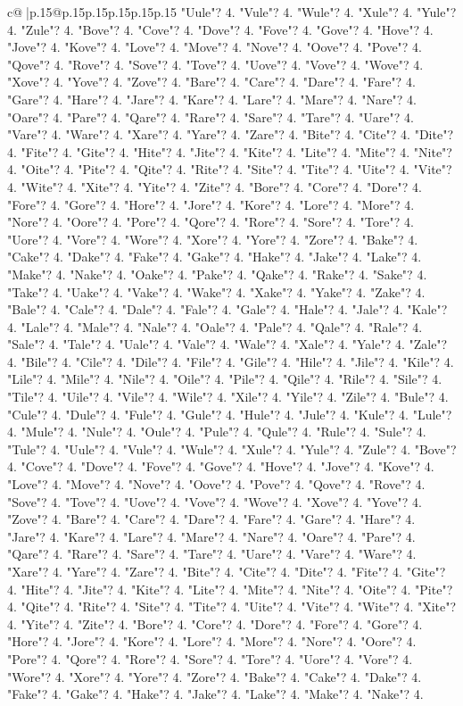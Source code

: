 \documentclass{article}
\begin{document}
{\begin{supertabular}{c@{$\;$}|p{.15\linewidth}@{}p{.15\linewidth}p{.15\linewidth}p{.15\linewidth}p{.15\linewidth}p{.15\linewidth}}
{{{"Uule"? 4. "Vule"? 4. "Wule"? 4. "Xule"? 4. "Yule"? 4. "Zule"? 4. "Bove"? 4. "Cove"? 4. "Dove"? 4. "Fove"? 4. "Gove"? 4. "Hove"? 4. "Jove"? 4. "Kove"? 4. "Love"? 4. "Move"? 4. "Nove"? 4. "Oove"? 4. "Pove"? 4. "Qove"? 4. "Rove"? 4. "Sove"? 4. "Tove"? 4. "Uove"? 4. "Vove"? 4. "Wove"? 4. "Xove"? 4. "Yove"? 4. "Zove"? 4. "Bare"? 4. "Care"? 4. "Dare"? 4. "Fare"? 4. "Gare"? 4. "Hare"? 4. "Jare"? 4. "Kare"? 4. "Lare"? 4. "Mare"? 4. "Nare"? 4. "Oare"? 4. "Pare"? 4. "Qare"? 4. "Rare"? 4. "Sare"? 4. "Tare"? 4. "Uare"? 4. "Vare"? 4. "Ware"? 4. "Xare"? 4. "Yare"? 4. "Zare"? 4. "Bite"? 4. "Cite"? 4. "Dite"? 4. "Fite"? 4. "Gite"? 4. "Hite"? 4. "Jite"? 4. "Kite"? 4. "Lite"? 4. "Mite"? 4. "Nite"? 4. "Oite"? 4. "Pite"? 4. "Qite"? 4. "Rite"? 4. "Site"? 4. "Tite"? 4. "Uite"? 4. "Vite"? 4. "Wite"? 4. "Xite"? 4. "Yite"? 4. "Zite"? 4. "Bore"? 4. "Core"? 4. "Dore"? 4. "Fore"? 4. "Gore"? 4. "Hore"? 4. "Jore"? 4. "Kore"? 4. "Lore"? 4. "More"? 4. "Nore"? 4. "Oore"? 4. "Pore"? 4. "Qore"? 4. "Rore"? 4. "Sore"? 4. "Tore"? 4. "Uore"? 4. "Vore"? 4. "Wore"? 4. "Xore"? 4. "Yore"? 4. "Zore"? 4. "Bake"? 4. "Cake"? 4. "Dake"? 4. "Fake"? 4. "Gake"? 4. "Hake"? 4. "Jake"? 4. "Lake"? 4. "Make"? 4. "Nake"? 4. "Oake"? 4. "Pake"? 4. "Qake"? 4. "Rake"? 4. "Sake"? 4. "Take"? 4. "Uake"? 4. "Vake"? 4. "Wake"? 4. "Xake"? 4. "Yake"? 4. "Zake"? 4. "Bale"? 4. "Cale"? 4. "Dale"? 4. "Fale"? 4. "Gale"? 4. "Hale"? 4. "Jale"? 4. "Kale"? 4. "Lale"? 4. "Male"? 4. "Nale"? 4. "Oale"? 4. "Pale"? 4. "Qale"? 4. "Rale"? 4. "Sale"? 4. "Tale"? 4. "Uale"? 4. "Vale"? 4. "Wale"? 4. "Xale"? 4. "Yale"? 4. "Zale"? 4. "Bile"? 4. "Cile"? 4. "Dile"? 4. "File"? 4. "Gile"? 4. "Hile"? 4. "Jile"? 4. "Kile"? 4. "Lile"? 4. "Mile"? 4. "Nile"? 4. "Oile"? 4. "Pile"? 4. "Qile"? 4. "Rile"? 4. "Sile"? 4. "Tile"? 4. "Uile"? 4. "Vile"? 4. "Wile"? 4. "Xile"? 4. "Yile"? 4. "Zile"? 4. "Bule"? 4. "Cule"? 4. "Dule"? 4. "Fule"? 4. "Gule"? 4. "Hule"? 4. "Jule"? 4. "Kule"? 4. "Lule"? 4. "Mule"? 4. "Nule"? 4. "Oule"? 4. "Pule"? 4. "Qule"? 4. "Rule"? 4. "Sule"? 4. "Tule"? 4. "Uule"? 4. "Vule"? 4. "Wule"? 4. "Xule"? 4. "Yule"? 4. "Zule"? 4. "Bove"? 4. "Cove"? 4. "Dove"? 4. "Fove"? 4. "Gove"? 4. "Hove"? 4. "Jove"? 4. "Kove"? 4. "Love"? 4. "Move"? 4. "Nove"? 4. "Oove"? 4. "Pove"? 4. "Qove"? 4. "Rove"? 4. "Sove"? 4. "Tove"? 4. "Uove"? 4. "Vove"? 4. "Wove"? 4. "Xove"? 4. "Yove"? 4. "Zove"? 4. "Bare"? 4. "Care"? 4. "Dare"? 4. "Fare"? 4. "Gare"? 4. "Hare"? 4. "Jare"? 4. "Kare"? 4. "Lare"? 4. "Mare"? 4. "Nare"? 4. "Oare"? 4. "Pare"? 4. "Qare"? 4. "Rare"? 4. "Sare"? 4. "Tare"? 4. "Uare"? 4. "Vare"? 4. "Ware"? 4. "Xare"? 4. "Yare"? 4. "Zare"? 4. "Bite"? 4. "Cite"? 4. "Dite"? 4. "Fite"? 4. "Gite"? 4. "Hite"? 4. "Jite"? 4. "Kite"? 4. "Lite"? 4. "Mite"? 4. "Nite"? 4. "Oite"? 4. "Pite"? 4. "Qite"? 4. "Rite"? 4. "Site"? 4. "Tite"? 4. "Uite"? 4. "Vite"? 4. "Wite"? 4. "Xite"? 4. "Yite"? 4. "Zite"? 4. "Bore"? 4. "Core"? 4. "Dore"? 4. "Fore"? 4. "Gore"? 4. "Hore"? 4. "Jore"? 4. "Kore"? 4. "Lore"? 4. "More"? 4. "Nore"? 4. "Oore"? 4. "Pore"? 4. "Qore"? 4. "Rore"? 4. "Sore"? 4. "Tore"? 4. "Uore"? 4. "Vore"? 4. "Wore"? 4. "Xore"? 4. "Yore"? 4. "Zore"? 4. "Bake"? 4. "Cake"? 4. "Dake"? 4. "Fake"? 4. "Gake"? 4. "Hake"? 4. "Jake"? 4. "Lake"? 4. "Make"? 4. "Nake"? 4. }}}
\end{supertabular}}
\end{document}
